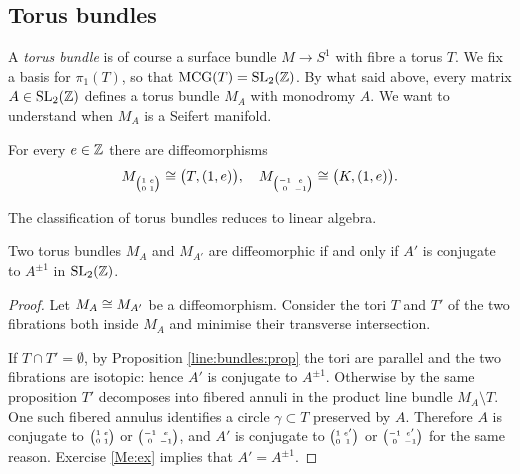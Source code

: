 \subsection{Torus bundles}
A \emph{torus bundle} is of course a surface bundle $M\to S^1$ with fibre a torus $T$. We fix a basis for $\pi_1(T)$, so that ${\rm MCG}(T) = {\rm SL}_2(\mathbb{Z})$. By what said above, every matrix $A\in {\rm SL}_2(\mathbb{Z})$ defines a torus bundle $M_A$ with monodromy $A$. We want to understand when $M_A$ is a Seifert manifold.

\begin{ex} \label{Me:ex}
For every $e\in\mathbb{Z}$ there are diffeomorphisms 
$$M_{\matr 1e01} \isom \big(T,(1,e)\big), \quad M_{\matr {-1}e0{-1}} \isom \big(K,(1,e)\big). $$
\end{ex}

The classification of torus bundles reduces to linear algebra.

\begin{prop} \label{torus:bundle:classification:prop}
Two torus bundles $M_A$ and $M_{A'}$ are diffeomorphic if and only if $A'$ is conjugate to $A^{\pm 1}$ in ${\rm SL}_2(\mathbb{Z})$.
\end{prop}
\begin{proof}
Let $M_A \cong M_{A'}$ be a diffeomorphism. Consider the tori $T$ and $T'$ of the two fibrations both inside $M_A$ and minimise their transverse intersection. 

If $T\cap T' = \emptyset$, by Proposition \ref{line:bundles:prop} the tori are parallel and the two fibrations are isotopic: hence $A'$ is conjugate to $A^{\pm 1}$. Otherwise by the same proposition $T'$ decomposes into fibered annuli in the product line bundle $M_A\setminus T$. One such fibered annulus identifies a circle $\gamma\subset T$ preserved by $A$. Therefore $A$ is conjugate to $\matr 1 e 0 1 $ or $\matr {-1} e 0 {-1}$, and $A'$ is conjugate to $\matr 1 {e'} 0 1 $ or $\matr {-1} {e'} 0 {-1}$ for the same reason. Exercise \ref{Me:ex} implies that $A' = A^{\pm 1}$.
\end{proof}

